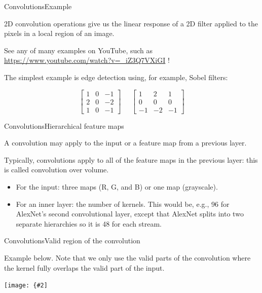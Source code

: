 \documentclass[aspectratio=169]{beamer}
\newcommand{\myfig}[3]{\centerline{\texttt{[image: \{\#2]}}}
\begin{document}
\begin{frame}{Convolutions}{Example}

  2D convolution operations give us the linear response of a 2D filter
  applied to the pixels in a local region of an image.

  \medskip

  See any of many examples on YouTube, such as
  \url{https://www.youtube.com/watch?v=_iZ3Q7VXiGI} !

  \medskip

  The simplest example is edge detection using, for example, Sobel
  filters:

  $$\begin{bmatrix} 1 & 0 & -1 \\ 2 & 0 & -2 \\ 1 & 0 & -1 \end{bmatrix}
  \;\;\;\;\;
  \begin{bmatrix} 1 & 2 & 1 \\ 0 & 0 & 0 \\ -1 & -2 & -1 \end{bmatrix}$$

\end{frame}


\begin{frame}{Convolutions}{Hierarchical feature maps}

  A convolution may apply to the \alert{input} or \alert{a feature map
    from a previous layer}.

  \medskip

  Typically, convolutions apply to all of the feature maps in the
  previous layer: this is called \alert{convolution over volume}.
  \begin{itemize}
  \item For the input: three maps (R, G, and B) or one map (grayscale).
  \item For an inner layer: the number of kernels. This would be,
    e.g., 96 for AlexNet's second convolutional layer, except that
    AlexNet splits into two separate hierarchies so it is 48 for each
    stream.
  \end{itemize}

\end{frame}


\begin{frame}{Convolutions}{Valid region of the convolution}

Example below. Note that we only use the \alert{valid} parts of the
convolution where the kernel fully overlaps the valid part of the
input.

\myfig{2.2in}{goodfellow-fig9-1}{Goodfellow et al. (2016), Figure 9.1}

\end{frame}
\end{document}
